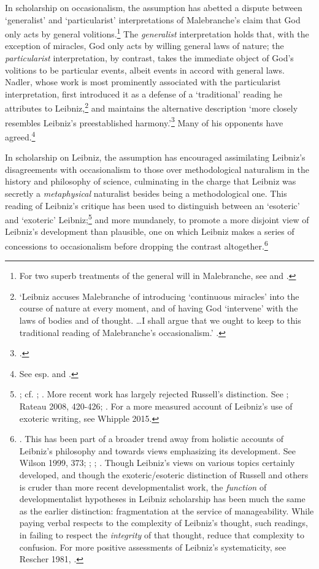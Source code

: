 \documentclass{article}
\begin{document}
In scholarship on occasionalism, the assumption has abetted a dispute
between `generalist' and `particularist' interpretations of
Malebranche's claim that God only acts by general volitions.\footnote{For
  two superb treatments of the general will in Malebranche, see \autocite{Schmaltz2008} and \autocite{Wahl2011}.} The \emph{generalist} interpretation holds that,
with the exception of miracles, God only acts by willing general laws of
nature; the \emph{particularist} interpretation, by contrast, takes the
immediate object of God's volitions to be particular events, albeit
events in accord with general laws. Nadler, whose work is most
prominently associated with the particularist interpretation, first
introduced it as a defense of a `traditional' reading he attributes to
Leibniz,\footnote{`Leibniz accuses Malebranche of introducing
  `continuous miracles' into the course of nature at every moment, and
  of having God `intervene' with the laws of bodies and of thought.
  \ldots I shall argue that we ought to keep to this traditional
  reading of Malebranche's occasionalism.' \autocite[32]{Nadler1993}.} and
maintains the alternative description `more closely resembles Leibniz's
preestablished harmony.'\footnote{\autocite[31]{Nadler1993}.} Many of his
opponents have agreed.\footnote{See esp. \autocite{Clarke1995} and \autocite{Scott1997}.}

In scholarship on Leibniz, the assumption has encouraged assimilating
Leibniz's disagreements with occasionalism to those over methodological
naturalism in the history and philosophy of science, culminating in the
charge that Leibniz was secretly a \emph{metaphysical} naturalist
besides being a methodological one. This reading of Leibniz's critique
has been used to distinguish between an `esoteric' and `exoteric'
Leibniz;\footnote{\autocite{Russell1951}; cf. \autocite{Shields1986}; \autocite[277-281]{Wilson1989}.
  More recent work has largely rejected Russell's distinction. See
  \autocite[4-9]{Mercer2001}; Rateau 2008, 420-426; \autocite{Antognazza2009}. For a more
  measured account of Leibniz's use of exoteric writing, see Whipple
  2015.} and more mundanely, to promote a more disjoint view of
Leibniz's development than plausible, one on which Leibniz makes a
series of concessions to occasionalism before dropping the contrast
altogether.\footnote{\autocite{Scott1997}. This has been part of a broader trend
  away from holistic accounts of Leibniz's philosophy and towards views
  emphasizing its development. See Wilson 1999, 373; \autocite[78]{Garber2008};
  \autocite[388]{Garber2009}; \autocite[223-232]{Garber2014}. Though Leibniz's views on various topics
  certainly developed, and though the exoteric/esoteric distinction of
  Russell and others is cruder than more recent developmentalist work,
  the \emph{function} of developmentalist hypotheses in Leibniz
  scholarship has been much the same as the earlier distinction:
  fragmentation at the service of manageability. While paying verbal
  respects to the complexity of Leibniz's thought, such readings, in
  failing to respect the \emph{integrity} of that thought, reduce that
  complexity to confusion. For more positive assessments of Leibniz's
  systematicity, see Rescher 1981, \autocite{Goldenbaum2002}.}
\end{document}
